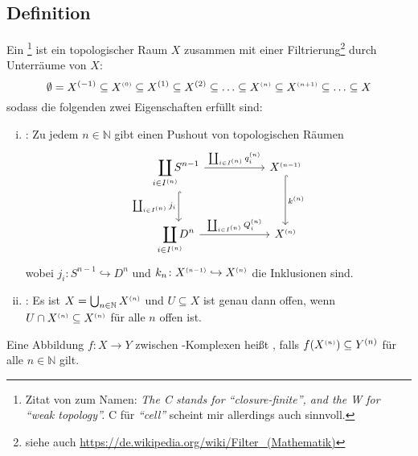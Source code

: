 \subsection[Definition: \CW-Komplex]{Definition} %
\label{sub:113}
Ein \footnote{Zitat von  zum Namen: 
\textenglish{\emph{The C stands for \enquote{closure-finite}, and the W for \enquote{weak topology}.}} C für \emph{\enquote{cell}} scheint mir allerdings auch sinnvoll.} ist ein topologischer Raum 
$X$ zusammen mit einer Filtrierung\footnote{siehe auch \url{https://de.wikipedia.org/wiki/Filter_(Mathematik)}} durch Unterräume von $X$: 
\[
	\emptyset = X^{(-1)} \subseteq X^{{\scriptscriptstyle(0)}} \subseteq X^{(1)} \subseteq X^{(2)} \subseteq  \ldots \subseteq X^{\scriptscriptstyle(n)} \subseteq X^{\scriptscriptstyle(n+1)} 
	\subseteq \ldots \subseteq X
\]
sodass die folgenden zwei Eigenschaften erfüllt sind:
\begin{enumerate}[(i)]
	\item {}: Zu jedem $n \in \mathds{N}$ gibt einen Pushout von topologischen Räumen 
	\[
		\begin{tikzcd}[row sep = large, column sep = 5.4em]
			\smashoperator{\coprod\limits_{i \in I^{(n)}}} S^{n-1} \rar["\coprod_{i \in I^{(n)}} q_i^\ssbrace{n}"] \dar["\coprod_{i \in I^{(n)}} j_i"', hook] 
			& X^\ssbrace{n-1} \dar[hook, "k^{(n)}"] \\
			\smashoperator{\coprod\limits_{i \in I^{(n)}}} D^n \rar["\coprod_{i \in I^{(n)}} Q_i^\ssbrace{n}"] & X^\ssbrace{n}
		\end{tikzcd}
	\]
	wobei $j_i \colon S^{n-1} \hookrightarrow D^n$ und $k_n \colon X^{\scriptscriptstyle(n-1)} \hookrightarrow X^{\scriptscriptstyle(n)}$ die Inklusionen sind.
	\item {}: Es ist $X= \bigcup_{n \in \mathbb{N}} X^{\scriptscriptstyle(n)}$ und $U \subseteq X$ ist genau dann offen, wenn $U \cap X^{\scriptscriptstyle(n)} \subseteq X^{\scriptscriptstyle(n)}$ für 
	alle $n$ offen ist.
\end{enumerate}
Eine Abbildung $f \colon X \to Y$ zwischen \CW-Komplexen heißt , falls $f\enbrace*{X^\ssbrace{n}}\subseteq Y^{(n)}$ für alle $n \in \mathds{N}$ gilt. 

